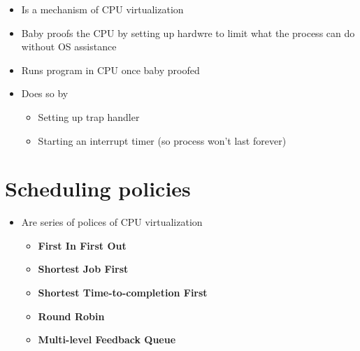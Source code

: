 \documentclass[12pt]{article}
\begin{document}
\begin{itemize}
    \item Is a mechanism of CPU virtualization
    \item Baby proofs the CPU by setting up hardwre to limit what the process can do without OS assistance
    \item Runs program in CPU once baby proofed
    \item Does so by
    \begin{itemize}
        \item Setting up trap handler
        \item Starting an interrupt timer (so process won't last forever)
    \end{itemize}
\end{itemize}

\section*{Scheduling policies}

\begin{itemize}
    \item Are series of polices of CPU virtualization

    \begin{itemize}
        \item \textbf{First In First Out}
        \item \textbf{Shortest Job First}
        \item \textbf{Shortest Time-to-completion First}
        \item \textbf{Round Robin}
        \item \textbf{Multi-level Feedback Queue}
    \end{itemize}
\end{itemize}
\end{document}
